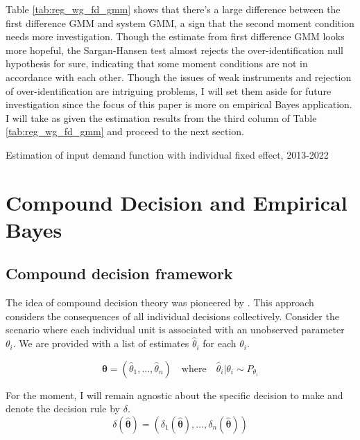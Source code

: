 \documentclass[12pt]{article}
\begin{document}
Table \ref{tab:reg_wg_fd_gmm} shows that there's a large difference between the
first difference GMM and system GMM, a sign that the second moment condition
needs more investigation. Though the estimate from first difference GMM looks
more hopeful, the Sargan-Hansen test almost rejects the over-identification
null hypothesis for sure, indicating that some moment conditions are not in
accordance with each other. Though the issues of weak instruments and rejection
of over-identification are intriguing problems, I will set them aside for
future investigation since the focus of this paper is more on empirical Bayes
application. I will take as given the estimation results from the third column
of Table \ref{tab:reg_wg_fd_gmm} and proceed to the next section.

\begin{table}
    
    \caption{Estimation of input demand function with individual fixed effect, 2013-2022}
    \label{tab:reg_wg_fd_gmm}
\end{table}

%     

\section{Compound Decision and Empirical Bayes}

\subsection{Compound decision framework}
The idea of compound decision theory was pioneered by
\citet{robbins1956empirical}. This approach considers the consequences of all
individual decisions collectively. Consider the scenario where each individual
unit is associated with an unobserved parameter \( \theta_i \). We are provided
with a list of estimates \( \hat{\theta}_i \) for each \( \theta_i \).

\begin{equation*}
    \boldsymbol{\hat{\theta}}  =  (\hat{\theta}_1,\ldots, \hat{\theta}_n)\quad
    \text{where} \quad        \hat{\theta}_i | \theta_i \sim P_{\theta_i}
\end{equation*}

For the moment, I will remain agnostic about the specific decision to make and
denote the decision rule by \( \delta \).
\begin{equation*}
    \delta(\boldsymbol{\hat{\theta}}) = (\delta_1(\boldsymbol{\hat{\theta}}), \ldots, \delta_n(\boldsymbol{\hat{\theta}}))
\end{equation*}
\end{document}
